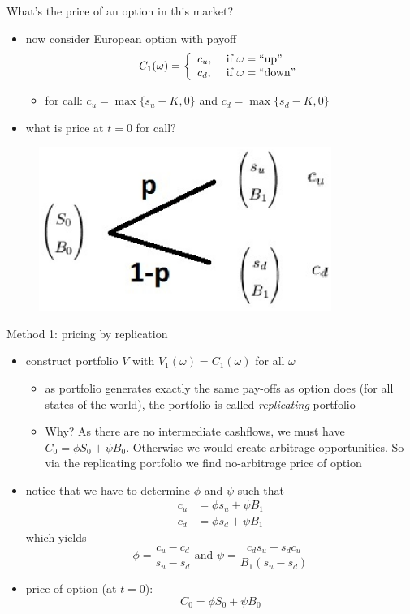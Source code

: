 \documentclass[pdf, handout]{beamer}
\begin{document}
\begin{frame}{What's the price of an option in this market?}
\begin{itemize}
\item now consider European option with payoff
\[
C_1(\omega)=\left\{
              \begin{array}{ll}
                c_u, & \hbox{ if }\omega=\text{``up''} \\
                c_d, & \hbox{ if }\omega=\text{``down''}
              \end{array}
            \right.
\]
\begin{itemize}
\item for call:  $c_u=\max\{s_u-K,0\}$ and $c_d=\max\{s_d-K,0\}$
\end{itemize}
\item what is price at $t=0$ for call?
\end{itemize}
\begin{figure}
\includegraphics[width=0.85\textwidth]{1period-2.eps}
\end{figure}
\end{frame}

\begin{frame}{Method 1: pricing by replication}
\begin{itemize}
\item construct portfolio $V$ with $V_1(\omega)=C_1(\omega)$ for all $\omega$
\begin{itemize}
\item as portfolio generates exactly the same pay-offs as option does (for all states-of-the-world), the portfolio is called \emph{replicating} portfolio
\item Why? As there are no intermediate cashflows, we must have $C_0 = \phi S_0 + \psi B_0$. Otherwise
we would create arbitrage opportunities. So via the replicating portfolio we find no-arbitrage price of option
\end{itemize}
\item notice that we have to determine $\phi$ and $\psi$ such that
\begin{align*}
c_u&= \phi s_u + \psi B_1 \\
c_d&= \phi s_d + \psi B_1
\end{align*}
which yields
\[
\phi=\frac{ c_u -c_d}{s_u-s_d} \text{ and } \psi=\frac{c_d s_u - s_d c_u}{B_1(s_u-s_d)}
\]
\item price of option (at $t=0$):
\[
C_0=\phi S_0 + \psi B_0
\]
\end{itemize}
\end{frame}
\end{document}
